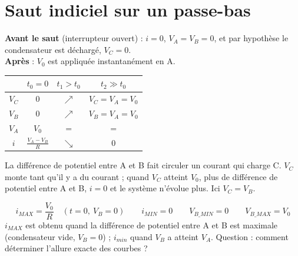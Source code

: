 \section{Saut indiciel sur un passe-bas}


\begin{exbox}[title={Observations : RC passe-bas, interrupteur fermé à $t_0 = 0$}]
\textbf{Avant le saut} (interrupteur ouvert) : $i = 0$, $V_A = V_B = 0$, et par hypothèse le
condensateur est déchargé, $V_C = 0$. \\
\textbf{Après} : $V_0$ est appliquée instantanément en A.
\begin{center}
\begin{tabular}{c|c|c|c}
 & $t_0 = 0$ & $t_1 > t_0$ & $t_2 \gg t_0$ \\ \hline
$V_C$ & 0 & $\nearrow$ & $V_C = V_A = V_0$ \\
$V_B$ & 0 & $\nearrow$ & $V_B = V_A = V_0$ \\
$V_A$ & $V_0$ & $=$ & $=$ \\
$i$ & $\frac{V_A - V_B}{R}$ & $\searrow$ & 0 \\
\end{tabular}
\end{center}
La différence de potentiel entre A et B fait circuler un courant qui charge C. $V_C$ monte
tant qu'il y a du courant ; quand $V_C$ atteint $V_0$, plus de différence de potentiel
entre A et B, $i = 0$ et le système n'évolue plus. Ici $V_C = V_B$.
\end{exbox}


\begin{propbox}[title=Ce qui est facile à calculer]
\[ i_{MAX} = \frac{V_0}{R}\quad (t = 0,\ V_B = 0) \qquad i_{MIN} = 0 \qquad
   V_{B\_MIN} = 0 \qquad V_{B\_MAX} = V_0 \]
$i_{MAX}$ est obtenu quand la différence de potentiel entre A et B est maximale
(condensateur vide, $V_B = 0$) ; $i_{min}$ quand $V_B$ a atteint $V_A$. Question : comment
déterminer l'allure exacte des courbes ?
\end{propbox}



